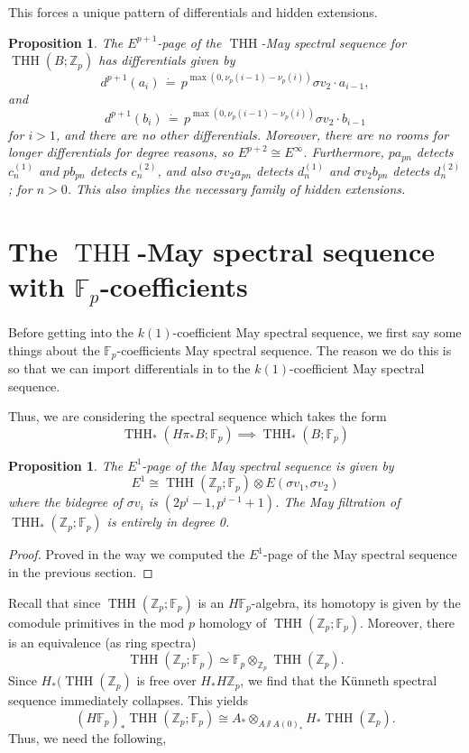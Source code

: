 \documentclass[12pt]{amsart}
\newcommand{\mmod}{\! \sslash \!}
\newcommand{\Z}{\mathbb{Z}}
\newcommand{\F}{\mathbb{F}}
\DeclareMathOperator{\THH}{THH}
\newtheorem{prop}[equation]{Proposition}
\theoremstyle{definition}
\numberwithin{equation}{section}
\numberwithin{figure}{section}
\begin{document}
This forces a unique pattern of differentials and hidden extensions. 

\begin{prop}
	The $E^{p+1}$-page of the $\THH$-May spectral sequence for $\THH(B;\Z_p)$ has  differentials given by 
	\[
	d^{p+1}(a_i)\, \dot{=}\, p^{\max(0, \nu_p(i-1)-\nu_p(i))}\sigma v_2\cdot a_{i-1},
	\]
	and 
	\[
	d^{p+1}(b_i)\, \dot{=}\, p^{\max(0, \nu_p(i-1)-\nu_p(i))}\sigma v_2\cdot b_{i-1}
	\]
	for $i>1$, and there are no other differentials. Moreover, there are no rooms for longer differentials for degree reasons, so $E^{p+2}\cong E^\infty$. Furthermore, $pa_{pn}$ detects $c_n^{(1)}$ and $pb_{pn}$ detects $c_n^{(2)}$, and also $\sigma v_2 a_{pn}$ detects $d_n^{(1)}$ and $\sigma v_2 b_{pn}$ detects $d_n^{(2)}$; for $n>0$. This also implies the necessary family of hidden extensions.  
\end{prop}

\section{The $\THH$-May spectral sequence with $\F_p$-coefficients}

Before getting into the $k(1)$-coefficient May spectral sequence, we first say some things about the $\F_p$-coefficients May spectral sequence. The reason we do this is so that we can import differentials in to the $k(1)$-coefficient May spectral sequence. 

Thus, we are considering the spectral sequence which takes the form 
\[
\THH_*(H\pi_*B; \F_p)\implies \THH_*(B; \F_p)
\]

\begin{prop}
	The $E^1$-page of the May spectral sequence is given by 
	\[
	E^1\cong \THH(\Z_p;\F_p)\otimes E(\sigma v_1, \sigma v_2)
	\]
	where the bidegree of $\sigma v_i$ is $(2p^i-1, p^{i-1}+1)$. The May filtration of $\THH_*(\Z_p;\F_p)$ is entirely in degree 0. 
\end{prop}
\begin{proof}
	Proved in the way we computed the $E^1$-page of the May spectral sequence in the previous section. 
\end{proof}

Recall that since $\THH(\Z_p;\F_p)$ is an $H\F_p$-algebra, its homotopy is given by the comodule primitives in the mod $p$ homology of $\THH(\Z_p;\F_p)$. Moreover, there is an equivalence (as ring spectra)
\[
\THH(\Z_p;\F_p)\simeq \F_p\otimes_{\Z_p}\THH(\Z_p).
\] 
Since $H_*(\THH(\Z_p)$ is free over $H_*H\Z_p$, we find that the K\"unneth spectral sequence immediately collapses. This yields
\[
(H\F_p)_*\THH(\Z_p;\F_p)\cong A_*\otimes_{A\mmod A(0)_*}H_*\THH(\Z_p).
\]
Thus, we need the following, 
\end{document}
